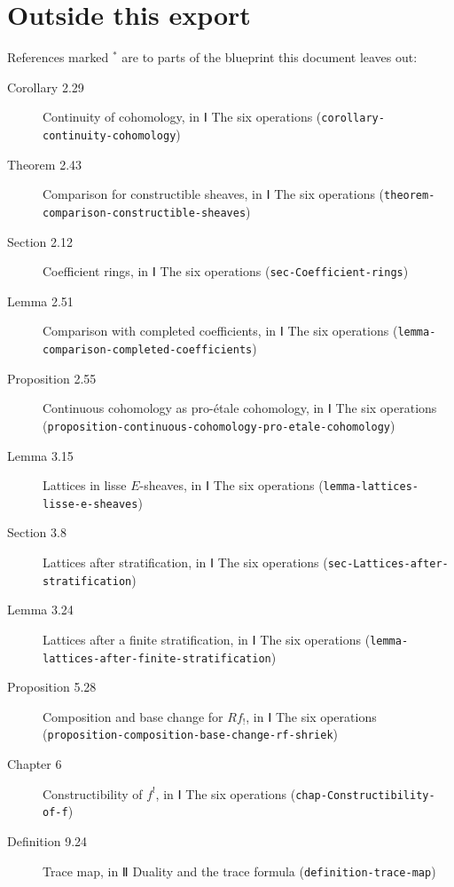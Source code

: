 \documentclass[11pt]{article}
\newcommand{\bpslug}[1]{\texttt{#1}}
\begin{document}
\section*{Outside this export}
References marked \ensuremath{{}^\ast} are to parts of the blueprint this document leaves out:
\begin{description}
\item[Corollary 2.29] Continuity of cohomology, in Ⅰ The six operations (\bpslug{corollary-{}\allowbreak{}continuity-{}\allowbreak{}cohomology})
\item[Theorem 2.43] Comparison for constructible sheaves, in Ⅰ The six operations (\bpslug{theorem-{}\allowbreak{}comparison-{}\allowbreak{}constructible-{}\allowbreak{}sheaves})
\item[Section 2.12] Coefficient rings, in Ⅰ The six operations (\bpslug{sec-{}\allowbreak{}Coefficient-{}\allowbreak{}rings})
\item[Lemma 2.51] Comparison with completed coefficients, in Ⅰ The six operations (\bpslug{lemma-{}\allowbreak{}comparison-{}\allowbreak{}completed-{}\allowbreak{}coefficients})
\item[Proposition 2.55] Continuous cohomology as pro-étale cohomology, in Ⅰ The six operations (\bpslug{proposition-{}\allowbreak{}continuous-{}\allowbreak{}cohomology-{}\allowbreak{}pro-{}\allowbreak{}etale-{}\allowbreak{}cohomology})
\item[Lemma 3.15] Lattices in lisse $E$-sheaves, in Ⅰ The six operations (\bpslug{lemma-{}\allowbreak{}lattices-{}\allowbreak{}lisse-{}\allowbreak{}e-{}\allowbreak{}sheaves})
\item[Section 3.8] Lattices after stratification, in Ⅰ The six operations (\bpslug{sec-{}\allowbreak{}Lattices-{}\allowbreak{}after-{}\allowbreak{}stratification})
\item[Lemma 3.24] Lattices after a finite stratification, in Ⅰ The six operations (\bpslug{lemma-{}\allowbreak{}lattices-{}\allowbreak{}after-{}\allowbreak{}finite-{}\allowbreak{}stratification})
\item[Proposition 5.28] Composition and base change for $Rf_!$, in Ⅰ The six operations (\bpslug{proposition-{}\allowbreak{}composition-{}\allowbreak{}base-{}\allowbreak{}change-{}\allowbreak{}rf-{}\allowbreak{}shriek})
\item[Chapter 6] Constructibility of $f^!$, in Ⅰ The six operations (\bpslug{chap-{}\allowbreak{}Constructibility-{}\allowbreak{}of-{}\allowbreak{}f})
\item[Definition 9.24] Trace map, in Ⅱ Duality and the trace formula (\bpslug{definition-{}\allowbreak{}trace-{}\allowbreak{}map})

\end{description}
\end{document}
